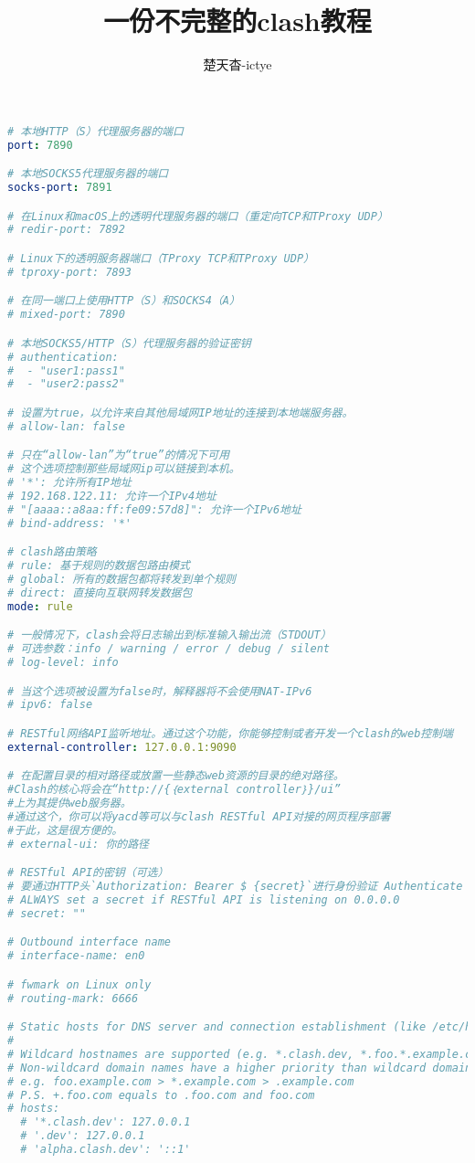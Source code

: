 \documentclass{ctexart}
\title{一份不完整的clash教程}
\author{楚天杳-ictye}
\begin{document}
\begin{lstlisting}[breaklines=true,language=yaml,style=yaml]
# 本地HTTP（S）代理服务器的端口
port: 7890

# 本地SOCKS5代理服务器的端口
socks-port: 7891

# 在Linux和macOS上的透明代理服务器的端口（重定向TCP和TProxy UDP）
# redir-port: 7892

# Linux下的透明服务器端口（TProxy TCP和TProxy UDP）
# tproxy-port: 7893

# 在同一端口上使用HTTP（S）和SOCKS4（A） 
# mixed-port: 7890

# 本地SOCKS5/HTTP（S）代理服务器的验证密钥
# authentication:
#  - "user1:pass1"
#  - "user2:pass2"

# 设置为true，以允许来自其他局域网IP地址的连接到本地端服务器。
# allow-lan: false

# 只在“allow-lan”为“true”的情况下可用
# 这个选项控制那些局域网ip可以链接到本机。
# '*': 允许所有IP地址
# 192.168.122.11: 允许一个IPv4地址
# "[aaaa::a8aa:ff:fe09:57d8]": 允许一个IPv6地址
# bind-address: '*'

# clash路由策略
# rule: 基于规则的数据包路由模式
# global: 所有的数据包都将转发到单个规则
# direct: 直接向互联网转发数据包
mode: rule

# 一般情况下，clash会将日志输出到标准输入输出流（STDOUT）
# 可选参数：info / warning / error / debug / silent
# log-level: info

# 当这个选项被设置为false时，解释器将不会使用NAT-IPv6
# ipv6: false

# RESTful网络API监听地址。通过这个功能，你能够控制或者开发一个clash的web控制端
external-controller: 127.0.0.1:9090

# 在配置目录的相对路径或放置一些静态web资源的目录的绝对路径。
#Clash的核心将会在“http://{｛external controller｝}/ui”
#上为其提供web服务器。
#通过这个，你可以将yacd等可以与clash RESTful API对接的网页程序部署
#于此，这是很方便的。
# external-ui: 你的路径

# RESTful API的密钥（可选） 
# 要通过HTTP头`Authorization: Bearer $ {secret}`进行身份验证 Authenticate by spedifying HTTP header `Authorization: Bearer ${secret}`
# ALWAYS set a secret if RESTful API is listening on 0.0.0.0
# secret: ""

# Outbound interface name
# interface-name: en0

# fwmark on Linux only
# routing-mark: 6666

# Static hosts for DNS server and connection establishment (like /etc/hosts)
#
# Wildcard hostnames are supported (e.g. *.clash.dev, *.foo.*.example.com)
# Non-wildcard domain names have a higher priority than wildcard domain names
# e.g. foo.example.com > *.example.com > .example.com
# P.S. +.foo.com equals to .foo.com and foo.com
# hosts:
  # '*.clash.dev': 127.0.0.1
  # '.dev': 127.0.0.1
  # 'alpha.clash.dev': '::1'


\end{lstlisting}
\end{document}
